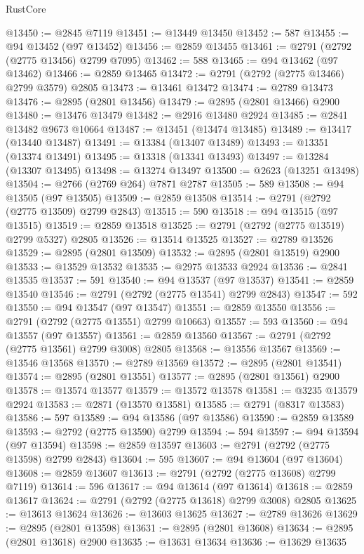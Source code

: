 \begin{lexlean}{RustCore}
\begin{coremodule}
@13450 := @2845 @7119
@13451 := @13449 @13450
@13452 := 587
@13455 := @94 @13452 (@97 @13452)
@13456 := @2859 @13455
@13461 := @2791 (@2792 (@2775 @13456) @2799 @7095)
@13462 := 588
@13465 := @94 @13462 (@97 @13462)
@13466 := @2859 @13465
@13472 := @2791 (@2792 (@2775 @13466) @2799 @3579) @2805
@13473 := @13461 @13472
@13474 := @2789 @13473
@13476 := @2895 (@2801 @13456)
@13479 := @2895 (@2801 @13466) @2900
@13480 := @13476 @13479
@13482 := @2916 @13480 @2924
@13485 := @2841 @13482 @9673 @10664
@13487 := @13451 (@13474 @13485)
@13489 := @13417 (@13440 @13487)
@13491 := @13384 (@13407 @13489)
@13493 := @13351 (@13374 @13491)
@13495 := @13318 (@13341 @13493)
@13497 := @13284 (@13307 @13495)
@13498 := @13274 @13497
@13500 := @2623 (@13251 @13498)
@13504 := @2766 (@2769 @264) @7871 @2787
@13505 := 589
@13508 := @94 @13505 (@97 @13505)
@13509 := @2859 @13508
@13514 := @2791 (@2792 (@2775 @13509) @2799 @2843)
@13515 := 590
@13518 := @94 @13515 (@97 @13515)
@13519 := @2859 @13518
@13525 := @2791 (@2792 (@2775 @13519) @2799 @5327) @2805
@13526 := @13514 @13525
@13527 := @2789 @13526
@13529 := @2895 (@2801 @13509)
@13532 := @2895 (@2801 @13519) @2900
@13533 := @13529 @13532
@13535 := @2975 @13533 @2924
@13536 := @2841 @13535
@13537 := 591
@13540 := @94 @13537 (@97 @13537)
@13541 := @2859 @13540
@13546 := @2791 (@2792 (@2775 @13541) @2799 @2843)
@13547 := 592
@13550 := @94 @13547 (@97 @13547)
@13551 := @2859 @13550
@13556 := @2791 (@2792 (@2775 @13551) @2799 @10663)
@13557 := 593
@13560 := @94 @13557 (@97 @13557)
@13561 := @2859 @13560
@13567 := @2791 (@2792 (@2775 @13561) @2799 @3008) @2805
@13568 := @13556 @13567
@13569 := @13546 @13568
@13570 := @2789 @13569
@13572 := @2895 (@2801 @13541)
@13574 := @2895 (@2801 @13551)
@13577 := @2895 (@2801 @13561) @2900
@13578 := @13574 @13577
@13579 := @13572 @13578
@13581 := @3235 @13579 @2924
@13583 := @2871 (@13570 @13581)
@13585 := @2791 (@8317 @13583)
@13586 := 597
@13589 := @94 @13586 (@97 @13586)
@13590 := @2859 @13589
@13593 := @2792 (@2775 @13590) @2799
@13594 := 594
@13597 := @94 @13594 (@97 @13594)
@13598 := @2859 @13597
@13603 := @2791 (@2792 (@2775 @13598) @2799 @2843)
@13604 := 595
@13607 := @94 @13604 (@97 @13604)
@13608 := @2859 @13607
@13613 := @2791 (@2792 (@2775 @13608) @2799 @7119)
@13614 := 596
@13617 := @94 @13614 (@97 @13614)
@13618 := @2859 @13617
@13624 := @2791 (@2792 (@2775 @13618) @2799 @3008) @2805
@13625 := @13613 @13624
@13626 := @13603 @13625
@13627 := @2789 @13626
@13629 := @2895 (@2801 @13598)
@13631 := @2895 (@2801 @13608)
@13634 := @2895 (@2801 @13618) @2900
@13635 := @13631 @13634
@13636 := @13629 @13635

\end{coremodule}
\end{lexlean}
